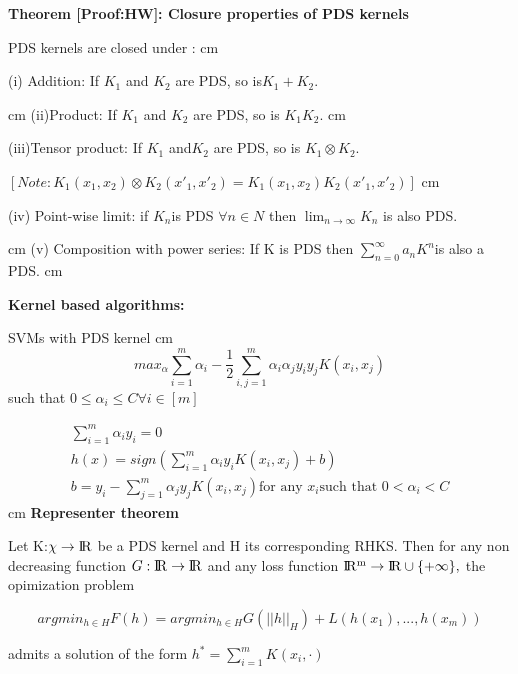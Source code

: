 \documentclass{article}
\begin{document}
	\textbf{Theorem [Proof:HW]: Closure properties of PDS kernels}
	
	PDS kernels are closed under :
	 cm
	
	(i) Addition: If $K_{1}$ and $K_{2}$ are PDS, so is$ K_{1}+K_{2}.$
	
	 cm
	(ii)Product: If $K_{1}$ and $K_{2}$ are PDS, so is $K_{1}K_{2}$.
	 cm
	
	(iii)Tensor product: If $K_{1}$ and$ K_{2}$ are PDS, so is $K_{1}\otimes K_{2}. $
	
	$[Note:K_1(x_1,x_2)\otimes K_2(x'_1,x'_2) = K_1(x_1,x_2)K_2(x'_1,x'_2)]$
					 cm
					
					(iv) Point-wise limit: if $K_{n} $is PDS $\forall n \in N $ then $\lim_{n \to \infty } K_{n}$ is also PDS.
					
					 cm
					(v) Composition with power series: If K is PDS then $\sum_{n=0}^{\infty} a_{n}K^{n} $is also a PDS.
					 cm
					
					\textbf{Kernel based algorithms:}
					
					SVMs with PDS kernel
					 cm
					\begin{equation}
					max_{\alpha}\sum_{i=1}^{m}\alpha_{i} - \frac{1}{2} \sum_{i,j=1}^{m}\alpha_{i}\alpha_{j}y_{i}y_{j}K(x_{i},x_{j}) \nonumber
					\end{equation}
					such that $0 \leq\alpha_{i}\leq C \forall i \in [m]$
					
					\begin{align}
					\sum_{i=1}^{m}\alpha_{i}y_{i}=0\\ \nonumber
					h(x)=sign(\sum_{i=1}^{m}\alpha_{i}y_{i}K(x_{i},x_{j})+b)\\ \nonumber
					b= y_{i}- \sum_{j=1}^{m}\alpha_{j}y_{j}K(x_{i},x_{j}) \text{for any }  x_{i} \text{such that }  0 < \alpha_{i}<C \nonumber 
					\end{align}
					 cm
					\textbf{Representer theorem}
					
					Let K:$\chi \rightarrow \rm I\!R$ be a PDS kernel and H its corresponding RHKS. Then for any non decreasing function $G:\rm I\!R  \rightarrow \rm I\!R$ and any loss function $\rm I\!R ^{m} \rightarrow \rm I\!R \cup \{+\infty\},$ the opimization problem
			
			$$ argmin_{h \in H}F(h) = argmin_{h \in H} G(||h||_{H}) + L(h(x_1),...,h(x_m))$$
			
			admits a solution of the form $h^{*} = \sum_{i=1}^{m} K(x_{i},\cdot)$
			
\end{document}
